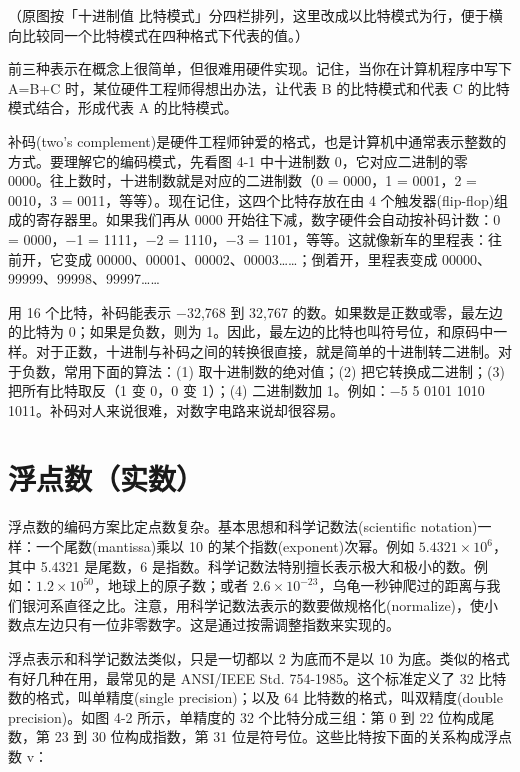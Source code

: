 （原图按「十进制值 
比特模式」分四栏排列，这里改成以比特模式为行，便于横向比较同一个比特模式在四种格式下代表的值。）

前三种表示在概念上很简单，但很难用硬件实现。记住，当你在计算机程序中写下
A=B+C 时，某位硬件工程师得想出办法，让代表 B 的比特模式和代表 C
的比特模式结合，形成代表 A 的比特模式。

补码(two's
complement)是硬件工程师钟爱的格式，也是计算机中通常表示整数的方式。要理解它的编码模式，先看图
4-1 中十进制数 0，它对应二进制的零
0000。往上数时，十进制数就是对应的二进制数（0 = 0000，1 = 0001，2 =
0010，3 = 0011，等等）。现在记住，这四个比特存放在由 4
个触发器(flip-flop)组成的寄存器里。如果我们再从 0000
开始往下减，数字硬件会自动按补码计数：0 = 0000，−1 = 1111，−2 = 1110，−3
= 1101，等等。这就像新车的里程表：往前开，它变成
00000、00001、00002、00003\ldots\ldots；倒着开，里程表变成
00000、99999、99998、99997\ldots\ldots{}

用 16 个比特，补码能表示 −32,768 到 32,767
的数。如果数是正数或零，最左边的比特为 0；如果是负数，则为
1。因此，最左边的比特也叫符号位，和原码中一样。对于正数，十进制与补码之间的转换很直接，就是简单的十进制转二进制。对于负数，常用下面的算法：(1)
取十进制数的绝对值；(2) 把它转换成二进制；(3) 把所有比特取反（1 变 0，0
变 1）；(4) 二进制数加 1。例如：−5  5  0101
 1010 
1011。补码对人来说很难，对数字电路来说却很容易。

\section{浮点数（实数）}

浮点数的编码方案比定点数复杂。基本思想和科学记数法(scientific
notation)一样：一个尾数(mantissa)乘以 10 的某个指数(exponent)次幂。例如
\(5.4321 \times 10^6\)，其中 5.4321 是尾数，6
是指数。科学记数法特别擅长表示极大和极小的数。例如：\(1.2 \times 10^{50}\)，地球上的原子数；或者
\(2.6 \times 10^{-23}\)，乌龟一秒钟爬过的距离与我们银河系直径之比。注意，用科学记数法表示的数要做规格化(normalize)，使小数点左边只有一位非零数字。这是通过按需调整指数来实现的。

浮点表示和科学记数法类似，只是一切都以 2 为底而不是以 10
为底。类似的格式有好几种在用，最常见的是 ANSI/IEEE Std.
754-1985。这个标准定义了 32 比特数的格式，叫单精度(single
precision)；以及 64 比特数的格式，叫双精度(double precision)。如图 4-2
所示，单精度的 32 个比特分成三组：第 0 到 22 位构成尾数，第 23 到 30
位构成指数，第 31 位是符号位。这些比特按下面的关系构成浮点数 v：

